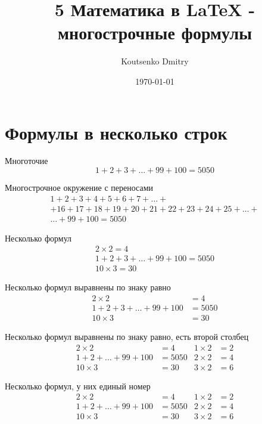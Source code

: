 \documentclass[a4paper,12pt]{article}                       %
\title{5 Математика в \LaTeX{} - многострочные формулы}
\author{Koutsenko Dmitry}
\date{\today}
\begin{document}

\maketitle

\section{Формулы в несколько строк}

Многоточие
\[ 1 + 2 + 3 + \dots + 99 + 100 = 5050 \]

Многострочное окружение с переносами
\begin{multline}
    1 + 2 + 3 + 4 + 5 + 6 + 7 + \dots + \\
    + 16 + 17 + 18 + 19 + 20 + 21 + 22 + 23 + 24 + 25 + \dots + \\
    \dots + 99 + 100 = 5050
\end{multline}

Несколько формул
\begin{align}
    2 \times 2 = 4                      \\
    1 + 2 + 3 + \dots + 99 + 100 = 5050 \\
    10 \times 3 = 30
\end{align}

Несколько формул выравнены по знаку равно
\begin{align}
    2 \times 2                   & = 4    \\
    1 + 2 + 3 + \dots + 99 + 100 & = 5050 \\
    10 \times 3                  & = 30
\end{align}

Несколько формул выравнены по знаку равно, есть второй столбец
\begin{align}
    2 \times 2               & = 4    & 1 \times 2 & = 2 \\
    1 + 2 + \dots + 99 + 100 & = 5050 & 2 \times 2 & = 4 \\
    10 \times 3              & = 30   & 3 \times 2 & = 6
\end{align}

Несколько формул, у них единый номер
\begin{equation}
    \begin{aligned}
        2 \times 2               & = 4    & 1 \times 2 & = 2 \\
        1 + 2 + \dots + 99 + 100 & = 5050 & 2 \times 2 & = 4 \\
        10 \times 3              & = 30   & 3 \times 2 & = 6
    \end{aligned}
\end{equation}
\end{document}
